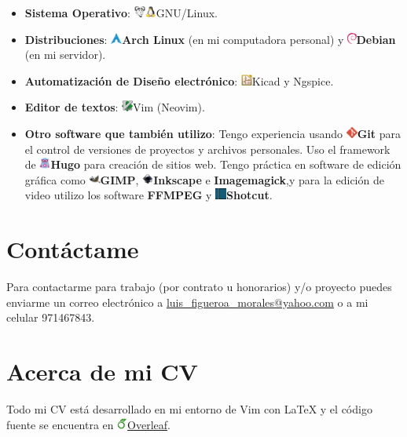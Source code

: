 \documentclass[10pt]{article}
\newcommand{\gnu}{\includegraphics[height=1em]{images/gnu.png}}
\newcommand{\arch}{\includegraphics[height=1em]{images/arch.png}}
\newcommand{\debian}{\includegraphics[height=1em]{images/debian.png}}
\newcommand{\kicad}{\includegraphics[height=1em]{images/kicad.png}}
\newcommand{\vim}{\includegraphics[height=1em]{images/vim.png}}
\newcommand{\git}{\includegraphics[height=1em]{images/git.png}}
\newcommand{\gohugo}{\includegraphics[height=1em]{images/gohugo.png}}
\newcommand{\gimp}{\includegraphics[height=1em]{images/gimp.png}}
\newcommand{\inkscape}{\includegraphics[height=1em]{images/inkscape.png}}
\newcommand{\shotcut}{\includegraphics[height=1em]{images/shotcut.png}}
\newcommand{\overleaf}{\includegraphics[height=1em]{images/overleaf.png}}
\newcommand{\linux}{\includegraphics[height=1em]{images/linux.png}}
\begin{document}
\begin{itemize}
    \item \textbf{Sistema Operativo}: \gnu\linux GNU/Linux.
    \item \textbf{Distribuciones}: \arch\textbf{Arch Linux} (en mi computadora personal) y \debian\textbf{Debian} (en mi servidor).
    \item \textbf{Automatización de Diseño electrónico}: \kicad Kicad y Ngspice.
    \item \textbf{Editor de textos}: \vim Vim (Neovim).
    \item \textbf{Otro software que también utilizo}: Tengo experiencia usando \git \textbf{Git} para el control de versiones de proyectos y archivos personales. Uso el framework de \gohugo \textbf{Hugo} para creación de sitios web. Tengo práctica en software de edición gráfica como \gimp \textbf{GIMP}, \inkscape \textbf{Inkscape} e \textbf{Imagemagick},y para la edición de video utilizo los software \textbf{FFMPEG} y \shotcut \textbf{Shotcut}.
\end{itemize}

\section{Contáctame}

Para contactarme para trabajo (por contrato u honorarios) y/o proyecto puedes enviarme un correo electrónico a \href{mailto:luis_figueroa_morales@yahoo.com}{luis\_figueroa\_morales@yahoo.com} o a mi celular 971467843.

\section{Acerca de mi CV}

Todo mi CV está desarrollado en mi entorno de Vim con \LaTeX{} y el código fuente se encuentra en \overleaf\href{https://www.overleaf.com/read/tzqrsyfkpskn}{Overleaf}.
\end{document}
